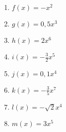 \begin{Exercise}[title={Skizziere das Schaubild, gib die Symmetrie sowie das Verhalten für sehr große/kleine \(x\) an.}, label=potenzA1]

	\begin{minipage}{\textwidth}
		\begin{minipage}{0.5\textwidth}
			\begin{enumerate}[label=\alph*)]
				\item \(f(x)=-x^2\)
				\item \(g(x)=0,5x^3\)
				\item \(h(x)=2x^6\)
				\item \(i(x)=-\frac{3}{2}x^5\)
			\end{enumerate}
		\end{minipage}%
		\begin{minipage}{0.5\textwidth}
			\begin{enumerate}[label=\alph*)]
				\setcounter{enumi}{4}
				\item \(j(x)=0,1x^4\)
				\item \(k(x)=-\frac{3}{5}x^7\)
				\item \(l(x)=-\sqrt{2}x^4\)
				\item \(m(x)=3x^5\)
			\end{enumerate}
		\end{minipage}%
	\end{minipage}%
\end{Exercise}
\newpage
